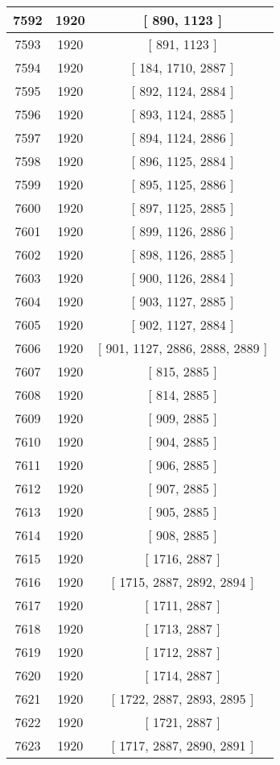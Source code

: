 \begin{center}
\begin{longtable}[H]{|| c c c ||}
\hline
7592 & 1920 & [ 890, 1123 ] \\ 
\hline
7593 & 1920 & [ 891, 1123 ] \\ 
\hline
7594 & 1920 & [ 184, 1710, 2887 ] \\ 
\hline
7595 & 1920 & [ 892, 1124, 2884 ] \\ 
\hline
7596 & 1920 & [ 893, 1124, 2885 ] \\ 
\hline
7597 & 1920 & [ 894, 1124, 2886 ] \\ 
\hline
7598 & 1920 & [ 896, 1125, 2884 ] \\ 
\hline
7599 & 1920 & [ 895, 1125, 2886 ] \\ 
\hline
7600 & 1920 & [ 897, 1125, 2885 ] \\ 
\hline
7601 & 1920 & [ 899, 1126, 2886 ] \\ 
\hline
7602 & 1920 & [ 898, 1126, 2885 ] \\ 
\hline
7603 & 1920 & [ 900, 1126, 2884 ] \\ 
\hline
7604 & 1920 & [ 903, 1127, 2885 ] \\ 
\hline
7605 & 1920 & [ 902, 1127, 2884 ] \\ 
\hline
7606 & 1920 & [ 901, 1127, 2886, 2888, 2889 ] \\ 
\hline
7607 & 1920 & [ 815, 2885 ] \\ 
\hline
7608 & 1920 & [ 814, 2885 ] \\ 
\hline
7609 & 1920 & [ 909, 2885 ] \\ 
\hline
7610 & 1920 & [ 904, 2885 ] \\ 
\hline
7611 & 1920 & [ 906, 2885 ] \\ 
\hline
7612 & 1920 & [ 907, 2885 ] \\ 
\hline
7613 & 1920 & [ 905, 2885 ] \\ 
\hline
7614 & 1920 & [ 908, 2885 ] \\ 
\hline
7615 & 1920 & [ 1716, 2887 ] \\ 
\hline
7616 & 1920 & [ 1715, 2887, 2892, 2894 ] \\ 
\hline
7617 & 1920 & [ 1711, 2887 ] \\ 
\hline
7618 & 1920 & [ 1713, 2887 ] \\ 
\hline
7619 & 1920 & [ 1712, 2887 ] \\ 
\hline
7620 & 1920 & [ 1714, 2887 ] \\ 
\hline
7621 & 1920 & [ 1722, 2887, 2893, 2895 ] \\ 
\hline
7622 & 1920 & [ 1721, 2887 ] \\ 
\hline
7623 & 1920 & [ 1717, 2887, 2890, 2891 ] \\ 

\end{longtable}
\end{center}
